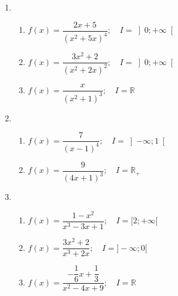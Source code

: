 \documentclass[12pt]{article}
\begin{document}
\begin{enumerate}
    \item 
    \begin{enumerate}
        \item $f(x) = \dfrac{2x + 5}{(x^2 + 5x)^4}; \quad I = \left]0; +\infty\right[$
        \item $f(x) = \dfrac{3x^2 + 2}{(x^2 + 2x)^2}; \quad I = \left]0; +\infty\right[$
        \item $f(x) = \dfrac{x}{(x^2 + 1)^3}; \quad I = \mathbb{R}$
    \end{enumerate}

    \item 
    \begin{enumerate}
        \item $f(x) = \dfrac{7}{(x - 1)^4}; \quad I = \left]-\infty; 1\right[$
        \item $f(x) = \dfrac{9}{(4x + 1)^3}; \quad I = \mathbb{R}_+$
    \end{enumerate}
    \item
    \begin{enumerate}
        \item $f(x) = \dfrac{1 - x^2}{x^3 - 3x + 1}; \quad I = [2; +\infty[$
        \item $f(x) = \dfrac{3x^2 + 2}{x^3 + 2x}; \quad I = ]-\infty; 0[$
        \item $f(x) = \dfrac{-\dfrac{1}{6}x + \dfrac{1}{3}}{x^2 - 4x + 9}; \quad I = \mathbb{R}$
    \end{enumerate}


\end{enumerate}
\end{document}
